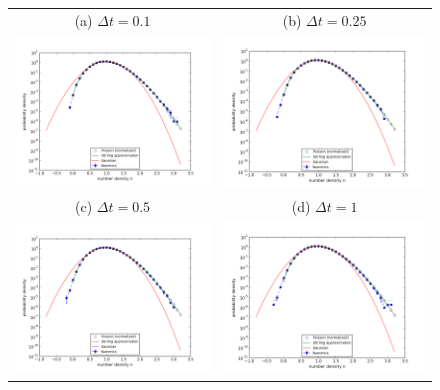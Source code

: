 \documentclass{article}
\begin{document}
\begin{figure}
\begin{center}
\end{center}
\begin{tabular}{cc}
(a) $\Delta t=0.1$ & (b) $\Delta t=0.25$ \\
\includegraphics[width=0.5\linewidth]{fig1/1d_DIFF_dt0.1_hist.png} &
\includegraphics[width=0.5\linewidth]{fig1/1d_DIFF_dt0.25_hist.png} \\
(c) $\Delta t=0.5$ & (d) $\Delta t=1$ \\
\includegraphics[width=0.5\linewidth]{fig1/1d_DIFF_dt0.5_hist.png} &
\includegraphics[width=0.5\linewidth]{fig1/1d_DIFF_dt1_hist.png} \\ 

\end{tabular}
\end{figure}
\end{document}
